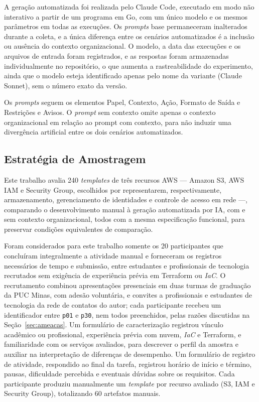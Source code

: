 A geração automatizada foi realizada pelo Claude Code, executado em modo não interativo a partir de um programa em Go, com um único modelo e os mesmos parâmetros em todas as execuções. Os \textit{prompts} base permaneceram inalterados durante a coleta, e a única diferença entre os cenários automatizados é a inclusão ou ausência do contexto organizacional. O modelo, a data das execuções e os arquivos de entrada foram registrados, e as respostas foram armazenadas individualmente no repositório, o que aumenta a rastreabilidade do experimento, ainda que o modelo esteja identificado apenas pelo nome da variante (Claude Sonnet), sem o número exato da versão.

Os \textit{prompts} seguem os elementos Papel, Contexto, Ação, Formato de Saída e Restrições e Avisos. O \textit{prompt} sem contexto omite apenas o contexto organizacional em relação ao prompt com contexto, para não induzir uma divergência artificial entre os dois cenários automatizados.

\subsection{Estratégia de Amostragem}
\label{subsec:amostragem}

Este trabalho avalia 240 \textit{templates} de três recursos AWS — Amazon S3, AWS IAM e Security Group, escolhidos por representarem, respectivamente, armazenamento, gerenciamento de identidades e controle de acesso em rede —, comparando o desenvolvimento manual à geração automatizada por IA, com e sem contexto organizacional, todos com a mesma especificação funcional, para preservar condições equivalentes de comparação.

Foram considerados para este trabalho somente os 20 participantes que concluíram integralmente a atividade manual e forneceram os registros necessários de tempo e submissão, entre estudantes e profissionais de tecnologia recrutados sem exigência de experiência prévia em Terraform ou \textit{IaC}. O recrutamento combinou apresentações presenciais em duas turmas de graduação da PUC Minas, com adesão voluntária, e convites a profissionais e estudantes de tecnologia da rede de contatos do autor; cada participante recebeu um identificador entre \texttt{p01} e \texttt{p30}, nem todos preenchidos, pelas razões discutidas na Seção~\ref{sec:ameacas}. Um formulário de caracterização registrou vínculo acadêmico ou profissional, experiência prévia com nuvem, \textit{IaC} e Terraform, e familiaridade com os serviços avaliados, para descrever o perfil da amostra e auxiliar na interpretação de diferenças de desempenho. Um formulário de registro de atividade, respondido ao final da tarefa, registrou horário de início e término, pausas, dificuldade percebida e eventuais dúvidas sobre os requisitos. Cada participante produziu manualmente um \textit{template} por recurso avaliado (S3, IAM e Security Group), totalizando 60 artefatos manuais.

